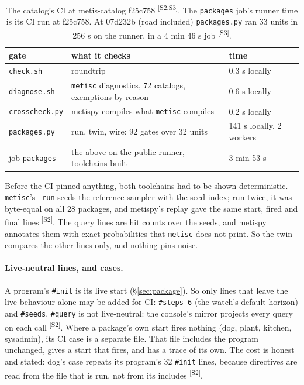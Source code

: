 \documentclass[11pt]{article}
\newcommand{\metisc}{\texttt{metisc}}
\newcommand{\src}[1]{\textsuperscript{[#1]}}
\begin{document}
\begin{table}[t]
\small\centering
\begin{tabular}{@{}lll@{}}
\toprule
gate & what it checks & time \\
\midrule
\texttt{check.sh} & roundtrip & 0.3 s locally \\
\texttt{diagnose.sh} & \metisc{} diagnostics, 72 catalogs, exemptions by reason & 0.6 s locally \\
\texttt{crosscheck.py} & metispy compiles what \metisc{} compiles & 0.2 s locally \\
\texttt{packages.py} & run, twin, wire: 92 gates over 32 units & 141 s locally, 2 workers \\
job \texttt{packages} & the above on the public runner, toolchains built & 3 min 53 s \\
\bottomrule
\end{tabular}
\caption{The catalog's CI at metis-catalog f25c758 \src{S2,S3}. The
\texttt{packages} job's runner time is its CI run at f25c758. At 07d232b
(road included) \texttt{packages.py} ran 33 units in 256 s on the
runner, in a 4 min 46 s job \src{S3}.}
\label{tab:ci}
\end{table}

Before the CI pinned anything, both toolchains had to be shown
deterministic. \metisc's \texttt{--run} seeds the reference sampler with
the seed index; run twice, it was byte-equal on all 28 packages, and
metispy's replay gave the same start, fired and final lines \src{S2}. The
query lines are hit counts over the seeds, and metispy annotates them
with exact probabilities that \metisc{} does not print. So the twin
compares the other lines only, and nothing pins noise.

\paragraph{Live-neutral lines, and cases.} A program's \texttt{\#init} is
its live start (\S\ref{sec:package}). So only lines that leave the live
behaviour alone may be added for CI: \texttt{\#steps 6} (the watch's
default horizon) and \texttt{\#seeds}. \texttt{\#query} is not
live-neutral: the console's mirror projects every query on each call
\src{S2}. Where a package's own start fires nothing (dog, plant, kitchen,
sysadmin), its CI case is a separate file. That file includes the program
unchanged, gives a start that fires, and has a trace of its own. The cost
is honest and stated: dog's case repeats its program's 32
\texttt{\#init} lines, because directives are read from the file that is
run, not from its includes \src{S2}.
\end{document}
